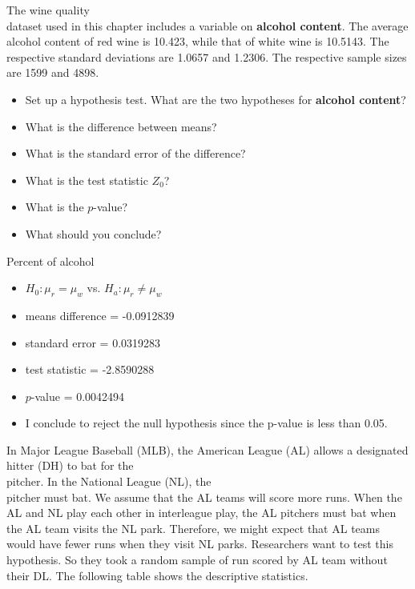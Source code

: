 \documentclass[11pt]{book}\usepackage[]{graphicx}\usepackage[]{color}
\begin{document}
\begin{exercises}
\begin{exercise} %



The wine quality \\ dataset used in this chapter includes a variable on \textbf{alcohol content}. The average alcohol content of red wine is 10.423, while that of white wine is 10.5143. The respective standard deviations are 1.0657 and 1.2306. The respective sample sizes are 1599 and 4898.

\begin{itemize}
  \item Set up a hypothesis test. What are the two hypotheses for \textbf{alcohol content}?
  \item What is the difference between means?
  \item What is the standard error of the difference?
  \item What is the test statistic $Z_0$?
  \item What is the $p$-value?
  \item What should you conclude?
\end{itemize}

\end{exercise}
\begin{solution} %

Percent of alcohol 

\begin{itemize}
  \item $H_0: \mu_r = \mu_w$ vs. $H_a: \mu_r \ne \mu_w$
  \item  means difference = -0.0912839
  \item  standard error  = 0.0319283
  \item  test statistic = -2.8590288
  \item  $p$-value = 0.0042494
  \item  I conclude to reject the null hypothesis since the p-value is less than 0.05.
\end{itemize}

\end{solution}

\begin{exercise} %



In Major League Baseball (MLB), the American League (AL) allows a designated hitter (DH) to bat for the \\ pitcher.  In the National League (NL), the \\ pitcher must bat.  We assume that the AL teams will score more runs.  When the AL and NL play each other in interleague play, the AL pitchers must bat when the AL team visits the NL park.  Therefore,  we might expect that AL teams would have fewer runs when they visit NL parks.  Researchers want to test this hypothesis.  So they took a random sample of run scored by AL team without their DL.  The following table shows the descriptive statistics.


\end{exercise}
\end{exercises}
\end{document}
